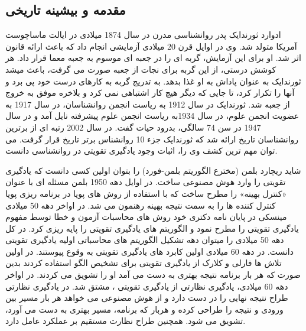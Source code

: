  \subsection{مقدمه و بیشینه تاریخی}
 ادوارد ثورندایک پدر روانشناسی مدرن در سال 1874 میلادی در ایالت ماساچوست آمریکا متولد شد. وی در اوایل قرن 20 میلادی آزمایشی انجام داد که باعث ارائه قانون اثر شد. او برای این آزمایش، گربه ای را در جعبه ای موسوم به جعبه معما قرار داد. هر کوشش درستی، از این گربه برای نجات از جعبه صورت می گرفت، باعث میشد ثورندایک به عنوان پاداش به او غذا بدهد. به تدریج گربه به کارهای درست خود پی برد و آنها را تکرار کرد، تا جایی که دیگر هیچ کار اشتباهی نمی کرد و بلاخره موفق به خروج از جعبه شد. ثورندایک در سال 1912 به ریاست انجمن روانشناسان، در سال 1917 به عضویت انجمن علوم، در سال 1934به ریاست انجمن علوم پیشرفته نایل آمد و در سال 1947 در سن 74 سالگی، بدرود حیات گفت. در سال 2002 رتبه ای از برترین روانشناسان تاریخ ارائه شد که ثورندایک جزء 10 روانشناس برتر تاریخ قرار گرفت. می توان مهم ترین کشف وی را، اثبات وجود یادگیری تقویتی در روانشناسی دانست.
 
 شاید ریچارد بلمن (مخترع الگوریتم بلمن-فورد) را بتوان اولین کسی دانست که یادگیری تقویتی را وارد هوش مصنوعی ساخت. در اوایل دهه 1950 بلمن مسئله ای با عنوان «کنترل بهینه» را مطرح ساخت که با استفاده از روش های پویا در برنامه ریزی پویا کنترل کننده ها را به سمت نتیجه بهینه رهنمون می شد. در اواخر دهه 50 میلادی مینسکی در پایان نامه دکتری خود روش های محاسبات آزمون و خطا توسط مفهوم یادگیری تقویتی را مطرح نمود و الگوریتم های یادگیری تقویتی را پایه ریزی کرد. در کل دهه 50 میلادی را میتوان دهه تشکیل الگوریتم های محاسباتی اولیه یادگیری تقویتی دانست. در دهه 60 میلادی اولین کابرد های یادگیری تقویتی به وقوع پیوستند. در اولین تلاش ها فارلی و کلارک از یادگیری تقویتی برای تشخیص الگو استفاده کردند بدین صورت که هر بار برنامه نتیجه بهتری به دست می آمد او را تشویق می کردند. در اواخر دهه 60 میلادی، یادگیری نظارتی از یادگیری تقویتی ، مشتق شد. در یادگیری نظارتی طراح نتیجه نهایی را در دست دارد و از هوش مصنوعی می خواهد هر بار مسیر بین ورودی و نتیجه را طراحی کرده و هربار که برنامه، مسیر بهتری به دست می آورد، تشویق می شود. همچنین طراح نظارت مستقیم بر عملکرد عامل دارد.
 